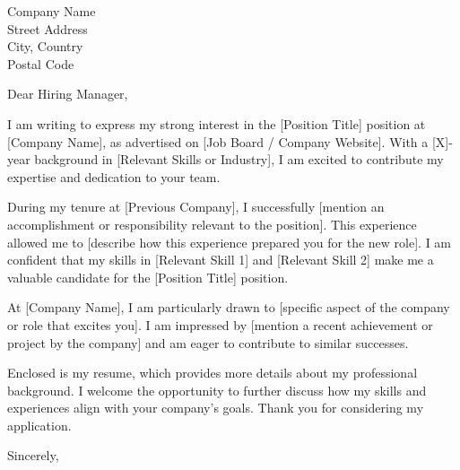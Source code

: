 \documentclass[a4paper,10pt]{letter}
\begin{document}
\begin{letter}{%
    Company Name \\
    Street Address \\
    City, Country \\
    Postal Code
}

\opening{Dear Hiring Manager,}

I am writing to express my strong interest in the [Position Title] position at [Company Name], as advertised on [Job Board / Company Website]. With a [X]-year background in [Relevant Skills or Industry], I am excited to contribute my expertise and dedication to your team.

During my tenure at [Previous Company], I successfully [mention an accomplishment or responsibility relevant to the position]. This experience allowed me to [describe how this experience prepared you for the new role]. I am confident that my skills in [Relevant Skill 1] and [Relevant Skill 2] make me a valuable candidate for the [Position Title] position.

At [Company Name], I am particularly drawn to [specific aspect of the company or role that excites you]. I am impressed by [mention a recent achievement or project by the company] and am eager to contribute to similar successes.

Enclosed is my resume, which provides more details about my professional background. I welcome the opportunity to further discuss how my skills and experiences align with your company's goals. Thank you for considering my application.

Sincerely, \\
[Your Full Name] \\
[Your Contact Information]

\end{letter}
\end{document}
